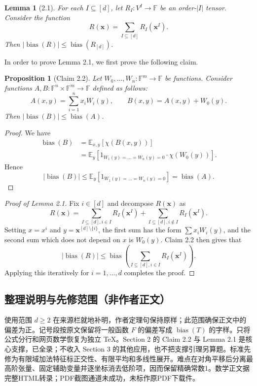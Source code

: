 \documentclass[UTF8,11pt]{ctexart}
\newtheorem*{lemma}{Lemma}
\newtheorem*{proposition}{Proposition}
\theoremstyle{definition}
\begin{document}
\begin{lemma}[2.1]
For each $I\subseteq[d]$, let $R_I:V^I\to\mathbb F$ be an order-$|I|$ tensor. Consider the function
\[
R(\mathbf x)=\sum_{I\subseteq[d]}R_I(\mathbf x^I).
\]
Then $|\operatorname{bias}(R)|\leq\operatorname{bias}(R_{[d]})$.
\end{lemma}
In order to prove Lemma 2.1, we first prove the following claim.
\begin{proposition}[Claim 2.2]
Let $W_0,\ldots,W_n:\mathbb F^m\to\mathbb F$ be functions. Consider functions $A,B:\mathbb F^n\times\mathbb F^m\to\mathbb F$ defined as follows:
\[
A(x,y)=\sum_{i=1}^n x_iW_i(y),\qquad B(x,y)=A(x,y)+W_0(y).
\]
Then $|\operatorname{bias}(B)|\leq\operatorname{bias}(A)$.
\end{proposition}
\begin{proof}
We have
\begin{align*}
\operatorname{bias}(B)&=\mathbb E_{x,y}[\chi(B(x,y))]\\
&=\mathbb E_y[1_{W_1(y)=\ldots=W_n(y)=0}\cdot\chi(W_0(y))].
\end{align*}
Hence
\[
|\operatorname{bias}(B)|\leq\mathbb E_y[1_{W_1(y)=\ldots=W_n(y)=0}]=\operatorname{bias}(A).
\]
\end{proof}
\begin{proof}[Proof of Lemma 2.1]
Fix $i\in[d]$ and decompose $R(\mathbf x)$ as
\[
R(\mathbf x)=\sum_{I\subseteq[d],i\in I}R_I(\mathbf x^I)+\sum_{I\subseteq[d],i\notin I}R_I(\mathbf x^I).
\]
Setting $x=x^i$ and $y=\mathbf x^{[d]\setminus\{i\}}$, the first sum has the form $\sum x_iW_i(y)$, and the second sum which does not depend on $x$ is $W_0(y)$. Claim 2.2 then gives that
\[
|\operatorname{bias}(R)|\leq\operatorname{bias}\left(\sum_{I\subseteq[d],i\in I}R_I(\mathbf x^I)\right).
\]
Applying this iteratively for $i=1,\ldots,d$ completes the proof.
\end{proof}

\subsection*{整理说明与先修范围（非作者正文）}
使用范围 $d\geq2$ 在来源栏就地补明，作者定理句保持原样；此范围确保正文中的偏差为正。记号段按原文保留将一般函数 $F$ 的偏差写成 $\operatorname{bias}(T)$ 的字样。只将公式分行和网页数学恢复为独立 TeX。Section 2 的 Claim 2.2 与 Lemma 2.1 是核心支撑，已全录；不收入 Section 3 的其他应用，也不把支撑引理另算题。标准先修为有限域加法特征标正交性、有限平均和多线性展开。难点在对角平移后分离最高阶张量、固定辅助变量并逐坐标消去低阶项，因而保留精确常数1。数学正文据完整HTML转录；PDF截图通道未成功，未标作原PDF下载件。
\end{document}

